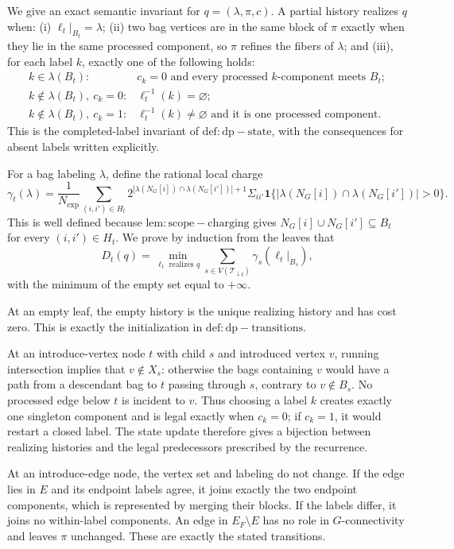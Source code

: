 We give an exact semantic invariant for \(q=(\lambda,\pi,c)\).  A partial history realizes \(q\) when: (i) \(\ell_t|_{B_t}=\lambda\); (ii) two bag vertices are in the same block of \(\pi\) exactly when they lie in the same processed component, so \(\pi\) refines the fibers of \(\lambda\); and (iii), for each label \(k\), exactly one of the following holds:
\[
\begin{array}{ll}
 k\in\lambda(B_t): & c_k=0\text{ and every processed }k\text{-component meets }B_t;\\
 k\notin\lambda(B_t),\ c_k=0: & \ell_t^{-1}(k)=\varnothing;\\
 k\notin\lambda(B_t),\ c_k=1: & \ell_t^{-1}(k)\ne\varnothing
   \text{ and it is one processed component.}
\end{array}
\]
This is the completed-label invariant of \(\mathrm{def:dp-state}\), with the consequences for absent labels written explicitly.

For a bag labeling \(\lambda\), define the rational local charge
\[
 \gamma_t(\lambda)=\frac1{N_{\exp}}
 \sum_{(i,i')\in H_t}
 2^{|\lambda(N_G[i])\cap\lambda(N_G[i'])|+1}\Sigma_{ii'}
 \mathbf 1\{|\lambda(N_G[i])\cap\lambda(N_G[i'])|>0\}.
\]
This is well defined because \(\mathrm{lem:scope-charging}\) gives
\(N_G[i]\cup N_G[i']\subseteq B_t\) for every \((i,i')\in H_t\).  We prove by induction from the leaves that
\[
 D_t(q)=\min_{\ell_t\text{ realizes }q}
       \sum_{s\in V(\mathcal T_{\downarrow t})}\gamma_s(\ell_t|_{B_s}),
 \tag{1}
\]
with the minimum of the empty set equal to \(+\infty\).

At an empty leaf, the empty history is the unique realizing history and has cost zero.  This is exactly the initialization in \(\mathrm{def:dp-transitions}\).

At an introduce-vertex node \(t\) with child \(s\) and introduced vertex \(v\), running intersection implies that \(v\notin X_s\): otherwise the bags containing \(v\) would have a path from a descendant bag to \(t\) passing through \(s\), contrary to \(v\notin B_s\).  No processed edge below \(t\) is incident to \(v\).  Thus choosing a label \(k\) creates exactly one singleton component and is legal exactly when \(c_k=0\); if \(c_k=1\), it would restart a closed label.  The state update therefore gives a bijection between realizing histories and the legal predecessors prescribed by the recurrence.

At an introduce-edge node, the vertex set and labeling do not change.  If the edge lies in \(E\) and its endpoint labels agree, it joins exactly the two endpoint components, which is represented by merging their blocks.  If the labels differ, it joins no within-label components.  An edge in \(E_F\setminus E\) has no role in \(G\)-connectivity and leaves \(\pi\) unchanged.  These are exactly the stated transitions.

